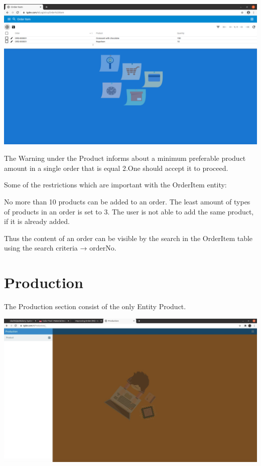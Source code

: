 \includegraphics[width=\textwidth]{sections/01-chapter/images/orderitem14.png}


The Warning under the Product informs about a minimum preferable product amount in a single order that is equal 2.One should accept it to proceed.

Some of the restrictions which are important with the OrderItem entity:

No more than 10 products can be added to an order. The least amount of types of products in an order is set to 3. The user is not able to add the same product, if it is already added.

Thus the content of an order can be visible by the search in the OrderItem table using the search criteria → orderNo.


\section{Production}

The Production section consist of the only Entity Product.

\includegraphics[width=\textwidth]{sections/01-chapter/images/production.png}

